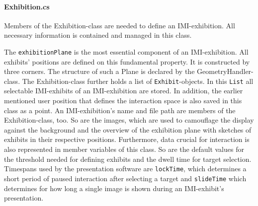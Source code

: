 
%

\paragraph{Exhibition.cs} Members of the Exhibition-class are needed to define an \ac{IMI}-exhibition. All necessary information is contained and managed in this class.

The \texttt{exhibitionPlane} is the most essential component of an \ac{IMI}-exhibition. All exhibits' positions are defined on this fundamental property. It is constructed by three corners. The structure of such a Plane is declared by the GeometryHandler-class. The Exhibition-class further holds a list of \texttt{Exhibit}-objects. In this \texttt{List} all selectable \ac{IMI}-exhibits of an \ac{IMI}-exhibition are stored. In addition, the earlier mentioned user position that defines the interaction space is also saved in this class as a point. An \ac{IMI}-exhibition's name and file path are members of the Exhibition-class, too. So are the images, which are used to camouflage the display against the background and the overview of the exhibition plane with sketches of exhibits in their respective positions. Furthermore, data crucial for interaction is also represented in member variables of this class. So are the default values for the threshold needed for defining exhibits and the dwell time for target selection. Timespans used by the presentation software are \texttt{lockTime}, which determines a short period of paused interaction after selecting a target and \texttt{slideTime} which determines for how long a single image is shown during an \ac{IMI}-exhibit's presentation.

